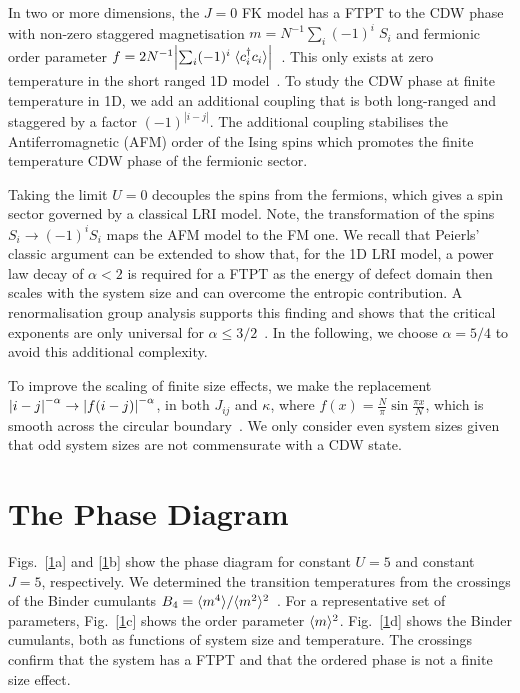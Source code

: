 In two or more dimensions, the \(J\!=0\!\) {FK} model has a {FTPT} to the {CDW} phase with non-zero staggered magnetisation \(m = N^{-1} \sum_i (-1)^i \; S_i\) and fermionic order parameter \(f = 2 N^{-1}\abs{\sum_i (-1)^i \; \langle c^\dag_{i}c_{i} \rangle}\)~\autocite{antipovInteractionTunedAndersonMott2016,maskaThermodynamicsTwodimensionalFalicovKimball2006}. This only exists at zero temperature in the short ranged 1D model~\autocite{kennedyItinerantElectronModel1986}. To study the {CDW} phase at finite temperature in 1D, we add an additional coupling that is both long-ranged and staggered by a factor \((-1)^{|i-j|}\). The additional coupling stabilises the Antiferromagnetic (AFM) order of the Ising spins which promotes the finite temperature {CDW} phase of the fermionic sector.

Taking the limit \(U = 0\) decouples the spins from the fermions, which gives a spin sector governed by a classical {LRI} model. Note, the transformation of the spins \(S_i \to (-1)^{i} S_i\) maps the AFM model to the FM one. We recall that Peierls' classic argument can be extended to show that, for the 1D {LRI} model, a power law decay of \(\alpha < 2\) is required for a {FTPT} as the energy of defect domain then scales with the system size and can overcome the entropic contribution. A renormalisation group analysis supports this finding and shows that the critical exponents are only universal for \(\alpha \leq 3/2\)~\autocite{ruelleStatisticalMechanicsOnedimensional1968,thoulessLongRangeOrderOneDimensional1969,angeliniRelationsShortrangeLongrange2014}. In the following, we choose \(\alpha = 5/4\) to avoid this additional complexity.

To improve the scaling of finite size effects, we make the replacement \(\abs{i - j}^{-\alpha} \rightarrow \abs{f(i - j)}^{-\alpha}\), in both \(J_{ij}\) and \(\kappa\), where \(f(x) = \frac{N}{\pi}\sin \frac{\pi x}{N}\), which is smooth across the circular boundary~\autocite{fukuiOrderNClusterMonte2009}. We only consider even system sizes given that odd system sizes are not commensurate with a {CDW} state.

\hypertarget{the-phase-diagram}{%
\section{The Phase Diagram}\label{the-phase-diagram}}

Figs.~{[}\protect\hyperlink{fig:phase_diagram}{1}a{]} and {[}\protect\hyperlink{fig:phase_diagram}{1}b{]} show the phase diagram for constant \(U=5\) and constant \(J=5\), respectively. We determined the transition temperatures from the crossings of the Binder cumulants \(B_4 = \langle m^4 \rangle/\langle m^2 \rangle^2\)~\autocite{binderFiniteSizeScaling1981}. For a representative set of parameters, Fig.~{[}\protect\hyperlink{fig:phase_diagram}{1}c{]} shows the order parameter \(\langle m \rangle^2\). Fig.~{[}\protect\hyperlink{fig:phase_diagram}{1}d{]} shows the Binder cumulants, both as functions of system size and temperature. The crossings confirm that the system has a {FTPT} and that the ordered phase is not a finite size effect.

